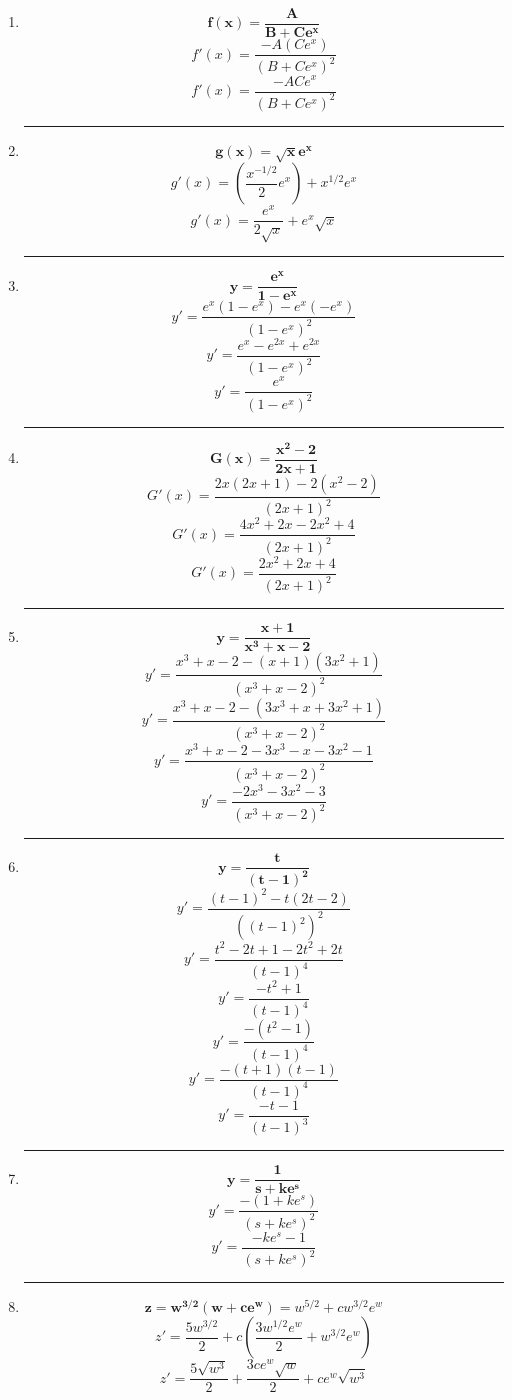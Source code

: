 \documentclass[12pt]{article}
\begin{document}
\begin{enumerate}[label=\textbf{\arabic*)}]
            \hrule\item \[\bm{f(x) = \frac{A}{B + Ce^x}}\]
                \[f'(x) = \frac{- A(Ce^x)}{(B + Ce^x)^2}\]
                \[f'(x) = \frac{- ACe^x}{(B + Ce^x)^2}\]

            \newpage
            \hrule\item \[\bm{g(x) = \sqrt{x} e^x}\]
                \[g'(x) = \left(\frac{x^{-1/2}}{2} e^x\right) + x^{1/2} e^x\]
                \[g'(x) = \frac{e^x}{2\sqrt{x}} + e^x \sqrt{x}\]

            \hrule\item \[\bm{y = \frac{e^x}{1 - e^x}}\]
                \[y' = \frac{e^x(1 - e^x) - e^x(-e^x)}{(1 - e^x)^2}\]
                \[y' = \frac{e^x - e^{2x} + e^{2x}}{(1 - e^x)^2}\]
                \[y' = \frac{e^x}{(1 - e^x)^2}\]

            \hrule\item \[\bm{G(x) = \frac{x^2 - 2}{2x + 1}}\]
               \[G'(x) = \frac{2x(2x + 1) - 2(x^2 - 2)}{(2x + 1)^2}\] 
               \[G'(x) = \frac{4x^2 + 2x - 2x^2 + 4}{(2x + 1)^2}\] 
               \[G'(x) = \frac{2x^2 + 2x + 4}{(2x + 1)^2}\] 

            \hrule\item \[\bm{y = \frac{x + 1}{x^3 + x - 2}}\]
                \[y' = \frac{x^3 + x - 2 - (x + 1)(3x^2 + 1)}{(x^3 + x - 2)^2}\] 
                \[y' = \frac{x^3 + x - 2 - (3x^3 + x + 3x^2 + 1)}{(x^3 + x - 2)^2}\] 
                \[y' = \frac{x^3 + x - 2 - 3x^3 - x - 3x^2 - 1}{(x^3 + x - 2)^2}\] 
                \[y' = \frac{-2x^3 - 3x^2 - 3}{(x^3 + x - 2)^2}\] 

            \newpage
            \hrule\item \[\bm{y = \frac{t}{(t - 1)^2}}\]
                \[y' = \frac{(t - 1)^2 - t(2t - 2)}{((t - 1)^2)^2}\] 
                \[y' = \frac{t^2 - 2t + 1 - 2t^2 + 2t}{(t - 1)^4}\] 
                \[y' = \frac{-t^2 + 1}{(t - 1)^4}\] 
                \[y' = \frac{-(t^2 - 1)}{(t - 1)^4}\] 
                \[y' = \frac{-(t + 1)(t - 1)}{(t - 1)^4}\] 
                \[y' = \frac{-t - 1}{(t - 1)^3}\] 

            \hrule\item \[\bm{y = \frac{1}{s + ke^s}}\]
                \[y' = \frac{- (1 + ke^s)}{(s + ke^s)^2}\] 
                \[y' = \frac{- ke^s - 1}{(s + ke^s)^2}\] 

            \hrule\item \[\bm{z = w^{3/2} (w + ce^w)} = w^{5/2} + cw^{3/2}e^w\]
                \[z' = \frac{5w^{3/2}}{2} + c\left(\frac{3w^{1/2} e^w}{2} + w^{3/2}e^w\right)\]
                \[z' = \frac{5\sqrt{w^3}}{2} + \frac{3ce^w\sqrt{w}}{2} + ce^w\sqrt{w^3}\] 



\end{enumerate}
\end{document}
